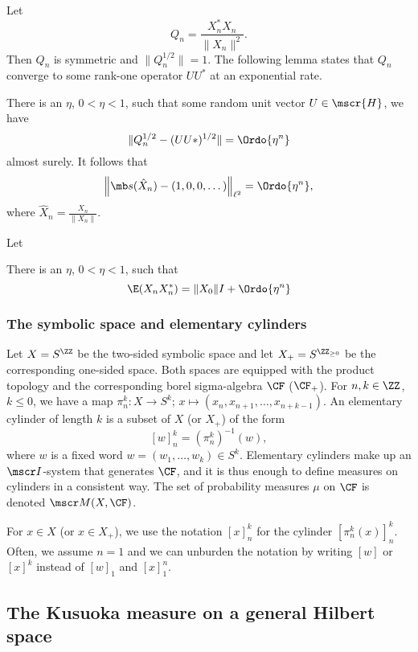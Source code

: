 \documentclass[11pt]{scrartcl}
\def\X{X}
\renewcommand{\H}{\mscr{H}}
\theoremstyle{plain} %
\theoremstyle{definition}
\begin{document}
Let 
$$ Q_n = \frac{X_n^* X_n}{\| X_n \|^2}. $$
Then $Q_n$ is symmetric and $\|Q_n^{1/2}\|=1$. 
The following lemma states that $Q_n$ converge to some rank-one
operator $UU^*$ at an exponential rate. 
\begin{lemma} 
  There is an $\eta$, $0<\eta<1$, 
  such that some random unit vector $U\in\H$, we have
  \begin{equation}\label{lim0}
  \| Q_n^{1/2} -(UU*)^{1/2}\| = \Ordo{\eta^n}
  \end{equation}
  almost surely. It follows that 
  $$ \left\| \mb s(\hat X_n) - (1,0,0,\dots) \right\|_{\ell^2} = \Ordo{\eta^n}, $$
  where $\hat X_n=\frac{X_n}{\|X_n\|}$. 
\end{lemma}

Let 
\begin{lemma} 
  There is an $\eta$, $0<\eta<1$, 
  such that
  \begin{equation}\label{lim0}
  \E( X_n X_n^* ) = \| X_0 \| I + \Ordo{\eta^n}
  \end{equation}
\end{lemma}





\subsubsection{The symbolic space and elementary cylinders}
Let $\X=S^\ZZ$ be the two-sided symbolic space and let
$\X_+=S^{\ZZ_{\geq0}}$ be the corresponding one-sided space. Both
spaces are equipped
with the product topology and the corresponding borel sigma-algebra
$\CF$ ($\CF_+$). For $n,k\in\ZZ$, $k\leq 0$, we have a map $\pi_n^k:
\X\to S^k$; $x\mapsto (x_n,x_{n+1},\dots,x_{n+k-1})$. An
elementary cylinder of length $k$ is a subset of $\X$ (or $\X_+$) of the form 
$$ [w]_n^k = (\pi_n^k)^{-1}(w), $$
where $w$ is a fixed word $w=(w_1,\dots,w_k)\in S^k$. Elementary cylinders make
up an $\mscr I$-system that generates $\CF$, and it is thus enough
to define measures on cylinders in a consistent way. The set of
probability measures $\mu$ on $\CF$ is denoted $\mscr M(X,\CF)$.

For $x\in\X$ (or $x\in\X_+$), 
we use the notation $[x]_n^k$ for the cylinder $[\pi_n^k(x)]_n^k$.
Often, we assume $n=1$ and
we can unburden the notation by writing $[w]$ or $[x]^k$ instead of
$[w]_1$ and $[x]_1^n$. 

\subsection{The Kusuoka measure on a general Hilbert space}
\end{document}
